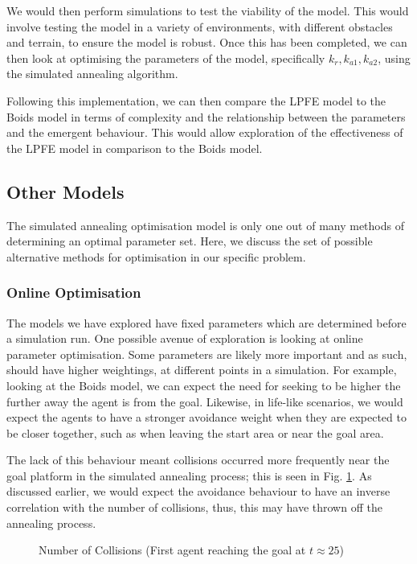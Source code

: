 \documentclass[12pt]{article}
\begin{document}
We would then perform simulations to test the viability of the model. This would involve testing the model in a variety of environments, with different obstacles and terrain, to ensure the model is robust. Once this has been completed, we can then look at optimising the parameters of the model, specifically $k_r,k_{a1},k_{a2}$, using the simulated annealing algorithm.

Following this implementation, we can then compare the LPFE model to the Boids model in terms of complexity and the relationship between the parameters and the emergent behaviour. This would allow exploration of the effectiveness of the LPFE model in comparison to the Boids model.

\subsection{Other Models}
The simulated annealing optimisation model is only one out of many methods of determining an optimal parameter set. Here, we discuss the set of possible alternative methods for optimisation in our specific problem.

\subsubsection{Online Optimisation}
The models we have explored have fixed parameters which are determined before a simulation run. One possible avenue of exploration is looking at online parameter optimisation. Some parameters are likely more important and as such, should have higher weightings, at different points in a simulation. For example, looking at the Boids model, we can expect the need for seeking to be higher the further away the agent is from the goal. Likewise, in life-like scenarios, we would expect the agents to have a stronger avoidance weight when they are expected to be closer together, such as when leaving the start area or near the goal area.

The lack of this behaviour meant collisions occurred more frequently near the goal platform in the simulated annealing process; this is seen in Fig. \ref{fig:collisions-goal}. As discussed earlier, we would expect the avoidance behaviour to have an inverse correlation with the number of collisions, thus, this may have thrown off the annealing process.

\begin{figure}[ht]
    \centering
    \caption{Number of Collisions (First agent reaching the goal at $t\approx 25$)}
    \label{fig:collisions-goal}
\end{figure}
\end{document}
